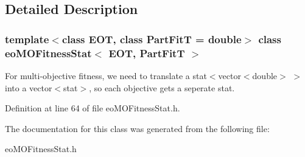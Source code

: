 \subsection{Detailed Description}
\subsubsection*{template$<$class EOT, class Part\-Fit\-T = double$>$ class eo\-MOFitness\-Stat$<$ EOT, Part\-Fit\-T $>$}

For multi-objective fitness, we need to translate a stat$<$vector$<$double$>$ $>$ into a vector$<$stat$>$, so each objective gets a seperate stat. 



Definition at line 64 of file eo\-MOFitness\-Stat.h.

The documentation for this class was generated from the following file:\begin{CompactItemize}
\item 
eo\-MOFitness\-Stat.h\end{CompactItemize}
